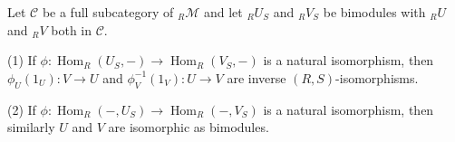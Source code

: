 Let $\mathcal{C}$ be a full subcategory of ${}_R\mathcal{M}$ and let ${}_R U_S$ and ${}_R V_S$ be bimodules with ${}_R U$ and ${}_R V$ both in $\mathcal{C}$.

(1) If $\phi: \operatorname{Hom}_R(U_S, -) \to \operatorname{Hom}_R(V_S, -)$ is a natural isomorphism, then $\phi_U(1_U): V \to U$ and $\phi_V^{-1}(1_V): U \to V$ are inverse $(R, S)$-isomorphisms.

(2) If $\phi: \operatorname{Hom}_R(-, U_S) \to \operatorname{Hom}_R(-, V_S)$ is a natural isomorphism, then similarly $U$ and $V$ are isomorphic as bimodules.
